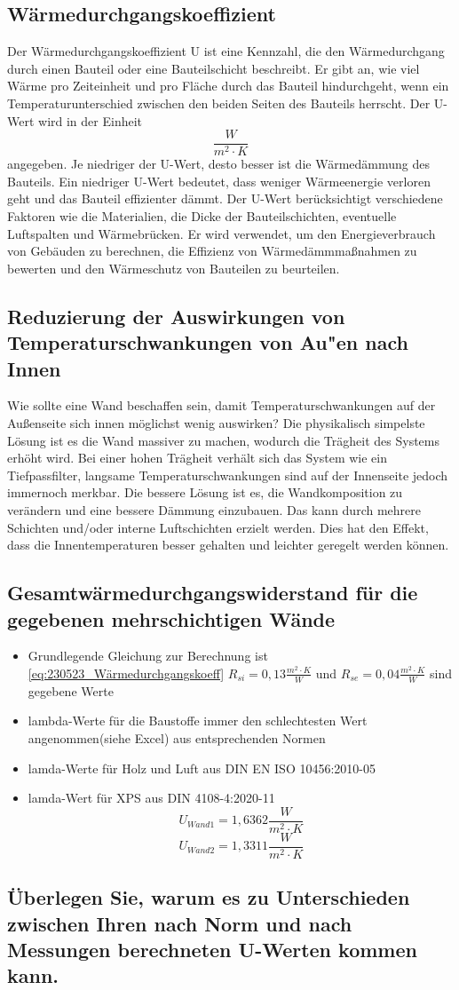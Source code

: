 \subsection{Wärmedurchgangskoeffizient}
Der Wärmedurchgangskoeffizient U ist eine Kennzahl, die den Wärmedurchgang durch einen Bauteil oder eine Bauteilschicht beschreibt. 
Er gibt an, wie viel Wärme pro Zeiteinheit und pro Fläche durch das Bauteil hindurchgeht, wenn ein Temperaturunterschied zwischen den beiden Seiten des Bauteils herrscht.
Der U-Wert wird in der Einheit $$\frac{W}{m^2 \cdot K}$$ angegeben. Je niedriger der U-Wert, desto besser ist die Wärmedämmung des Bauteils. 
Ein niedriger U-Wert bedeutet, dass weniger Wärmeenergie verloren geht und das Bauteil effizienter dämmt.
Der U-Wert berücksichtigt verschiedene Faktoren wie die Materialien, die Dicke der Bauteilschichten, eventuelle Luftspalten und Wärmebrücken. 
Er wird verwendet, um den Energieverbrauch von Gebäuden zu berechnen, die Effizienz von Wärmedämmmaßnahmen zu bewerten und den Wärmeschutz von Bauteilen zu beurteilen.

\subsection{Reduzierung der Auswirkungen von Temperaturschwankungen von Au"en nach Innen}

Wie sollte eine Wand beschaffen sein, damit Temperaturschwankungen auf
der Außenseite sich innen möglichst wenig auswirken?
Die physikalisch simpelste Lösung ist es die Wand massiver zu machen, wodurch die Trägheit des Systems erhöht wird.
Bei einer hohen Trägheit verhält sich das System wie ein Tiefpassfilter, langsame Temperaturschwankungen sind auf der Innenseite jedoch immernoch merkbar.
Die bessere Lösung ist es, die Wandkomposition zu verändern und eine bessere Dämmung einzubauen.
Das kann durch mehrere Schichten und/oder interne Luftschichten erzielt werden.
Dies hat den Effekt, dass die Innentemperaturen besser gehalten und leichter geregelt werden können.

\subsection{Gesamtwärmedurchgangswiderstand für die gegebenen mehrschichtigen Wände}
\begin{itemize}
\item Grundlegende Gleichung zur Berechnung ist \autoref{eq:230523_Wärmedurchgangskoeff} $R_{si}=0,13\frac{m^2 \cdot K}{W}$ und $R_{se}=0,04\frac{m^2 \cdot K}{W}$ sind gegebene Werte
\item lambda-Werte für die Baustoffe immer den schlechtesten Wert angenommen(siehe Excel) aus entsprechenden Normen
\item lamda-Werte für Holz \cite[S.20]{lamda-holz-luft} und Luft\cite[S. 15]{lamda-holz-luft} aus DIN EN ISO 10456:2010-05
\item lamda-Wert für XPS \cite[S.23]{lamda-xps} aus DIN 4108-4:2020-11
$$U_{Wand 1}=1,6362 \frac{W}{m^2 \cdot K}$$
$$U_{Wand 2}=1,3311 \frac{W}{m^2 \cdot K}$$
\end{itemize}


\subsection{Überlegen Sie, warum es zu Unterschieden zwischen Ihren nach Norm und nach Messungen berechneten U-Werten kommen kann.}

